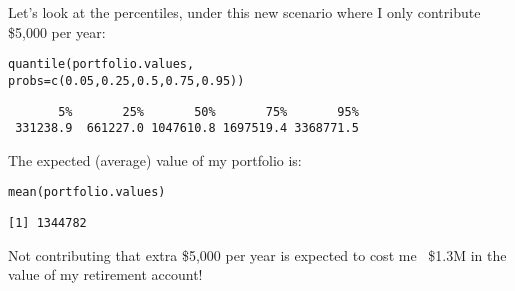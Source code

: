 \documentclass{beamer}\usepackage[]{graphicx}\usepackage[]{color}
\makeatletter
\newcommand{\hlnum}[1]{\textcolor[rgb]{0.824,0.412,0.118}{#1}}%
\newcommand{\hlstd}[1]{\textcolor[rgb]{1,0.894,0.769}{#1}}%
\newcommand{\hlkwc}[1]{\textcolor[rgb]{0.78,0.941,0.545}{#1}}%
\newcommand{\hlkwd}[1]{\textcolor[rgb]{1,0.78,0.769}{#1}}%
\newenvironment{kframe}{%
 \def\at@end@of@kframe{}%
 \ifinner\ifhmode%
  \def\at@end@of@kframe{\end{minipage}}%
  \begin{minipage}{\columnwidth}%
 \fi\fi%
 \def\FrameCommand##1{\hskip\@totalleftmargin \hskip-\fboxsep
 \colorbox{shadecolor}{##1}\hskip-\fboxsep
     \hskip-\linewidth \hskip-\@totalleftmargin \hskip\columnwidth}%
 \MakeFramed {\advance\hsize-\width
   \@totalleftmargin\z@ \linewidth\hsize
   \@setminipage}}%
 {\par\unskip\endMakeFramed%
 \at@end@of@kframe}
\newenvironment{knitrout}{}{} %
\makeatother
\begin{document}
\begin{darkframes}
    \begin{frame}[fragile]
      Let's look at the percentiles, under this new scenario where I only contribute \$5,000 per year:
\begin{knitrout}
\begin{kframe}
\begin{alltt}
\hlkwd{quantile}\hlstd{(portfolio.values,}
  \hlkwc{probs}\hlstd{=}\hlkwd{c}\hlstd{(}\hlnum{0.05}\hlstd{,} \hlnum{0.25}\hlstd{,} \hlnum{0.5}\hlstd{,} \hlnum{0.75}\hlstd{,} \hlnum{0.95}\hlstd{))}
\end{alltt}
\begin{verbatim}
       5%       25%       50%       75%       95% 
 331238.9  661227.0 1047610.8 1697519.4 3368771.5 
\end{verbatim}
\end{kframe}
\end{knitrout}

      \bigskip
      The expected (average) value of my portfolio is:
\begin{knitrout}
\begin{kframe}
\begin{alltt}
\hlkwd{mean}\hlstd{(portfolio.values)}
\end{alltt}
\begin{verbatim}
[1] 1344782
\end{verbatim}
\end{kframe}
\end{knitrout}

      \pause\bigskip

      Not contributing that extra \$5,000 per year is expected to cost me ~\$1.3M in the value of my retirement account!
    \end{frame}


\end{darkframes}
\end{document}
